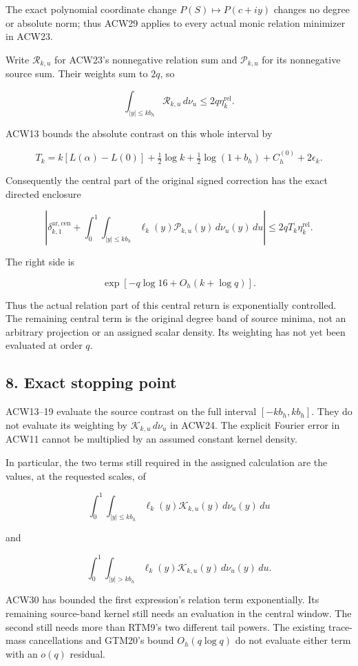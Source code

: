 The exact polynomial coordinate change \(P(S)\mapsto P(c+iy)\) changes no degree or absolute norm; thus ACW29 applies to every actual monic relation minimizer in ACW23.

Write \(\mathcal R_{k,u}\) for ACW23's nonnegative relation sum and \(\mathcal P_{k,u}\) for its nonnegative source sum. Their weights sum to \(2q\), so

\[
\int_{|y|\le kb_h}\mathcal R_{k,u}\,d\nu_u
\le2q\eta_k^{\mathrm{rel}}.
\]

ACW13 bounds the absolute contrast on this whole interval by

\[
T_k=k[L(\alpha)-L(0)]
+\tfrac12\log k+\tfrac12\log(1+b_h)+C_h^{(0)}+2\epsilon_k.
\]

Consequently the central part of the original signed correction has the exact directed enclosure

\[
\boxed{
\left|\delta_{k,1}^{\mathrm{ar,cen}}
+\int_0^1\int_{|y|\le kb_h}
\ell_k(y)\mathcal P_{k,u}(y)\,d\nu_u(y)\,du\right|
\le2qT_k\eta_k^{\mathrm{rel}}.}
\tag{ACW30}
\]

The right side is

\[
\exp[-q\log16+O_h(k+\log q)].
\]

Thus the actual relation part of this central return is exponentially controlled. The remaining central term is the original degree band of source minima, not an arbitrary projection or an assigned scalar density. Its weighting has not yet been evaluated at order \(q\).

\subsection{8. Exact stopping point}\label{exact-stopping-point}

ACW13--19 evaluate the source contrast on the full interval \([-kb_h,kb_h]\). They do not evaluate its weighting by \(\mathcal K_{k,u}\,d\nu_u\) in ACW24. The explicit Fourier error in ACW11 cannot be multiplied by an assumed constant kernel density.

In particular, the two terms still required in the assigned calculation are the values, at the requested scales, of

\[
\int_0^1\int_{|y|\le kb_h}
\ell_k(y)\mathcal K_{k,u}(y)\,d\nu_u(y)\,du
\]

and

\[
\int_0^1\int_{|y|>kb_h}
\ell_k(y)\mathcal K_{k,u}(y)\,d\nu_u(y)\,du.
\]

ACW30 has bounded the first expression's relation term exponentially. Its remaining source-band kernel still needs an evaluation in the central window. The second still needs more than RTM9's two different tail powers. The existing trace-mass cancellations and GTM20's bound \(O_h(q\log q)\) do not evaluate either term with an \(o(q)\) residual.

